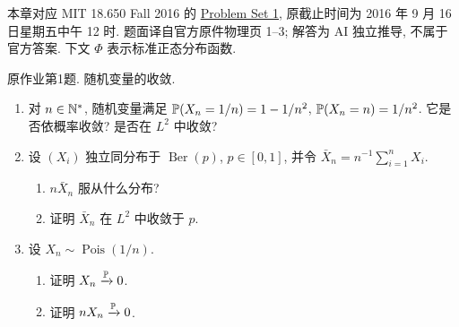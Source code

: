 \label{chap:ps01}
本章对应 MIT 18.650 Fall 2016 的 \href{https://ocw.mit.edu/courses/18-650-statistics-for-applications-fall-2016/resources/problem-set-1/}{Problem Set 1}, 原截止时间为 2016 年 9 月 16 日星期五中午 12 时. 题面译自官方原件物理页 1--3; 解答为 AI 独立推导, 不属于官方答案. 下文 $\Phi$ 表示标准正态分布函数.

\begin{exercise}\label{ps01:p01}
原作业第1题. 随机变量的收敛.
\begin{enumerate}[label=\arabic*.]
\item 对 $n\in\mathbb N^*$, 随机变量满足 $\mathbb P(X_n=1/n)=1-1/n^2$, $\mathbb P(X_n=n)=1/n^2$. 它是否依概率收敛? 是否在 $L^2$ 中收敛?
\item 设 $(X_i)$ 独立同分布于 $\operatorname{Ber}(p)$, $p\in[0,1]$, 并令 $\bar X_n=n^{-1}\sum_{i=1}^nX_i$.
\begin{enumerate}[label=(\alph*)]
\item $n\bar X_n$ 服从什么分布?
\item 证明 $\bar X_n$ 在 $L^2$ 中收敛于 $p$.
\end{enumerate}
\item 设 $X_n\sim\operatorname{Pois}(1/n)$.
\begin{enumerate}[label=(\alph*)]
\item 证明 $X_n\xrightarrow{\mathbb P}0$.
\item 证明 $nX_n\xrightarrow{\mathbb P}0$.
\end{enumerate}
\end{enumerate}
\end{exercise}
